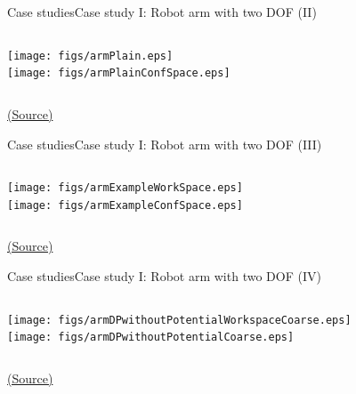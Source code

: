 \documentclass[10pt,compress]{beamer} %
\begin{document}
\begin{frame}{Case studies}{Case study I: Robot arm with two DOF (II)}
       \begin{columns}
            \centering \texttt{[image: figs/armPlain.eps]}\\
            \centering \texttt{[image: figs/armPlainConfSpace.eps]}\\
     \end{columns}
  \centering \tiny{\href{http://aima.cs.berkeley.edu/index.html}{(Source)}}
\end{frame}

\begin{frame}{Case studies}{Case study I: Robot arm with two DOF (III)}
       \begin{columns}
	            \centering \texttt{[image: figs/armExampleWorkSpace.eps]}\\
	            \centering \texttt{[image: figs/armExampleConfSpace.eps]}\\
      \end{columns}
	  \centering \tiny{\href{http://aima.cs.berkeley.edu/index.html}{(Source)}}
\end{frame}

\begin{frame}{Case studies}{Case study I: Robot arm with two DOF (IV)}
       \begin{columns}
	            \centering \texttt{[image: figs/armDPwithoutPotentialWorkspaceCoarse.eps]}\\
	            \centering \texttt{[image: figs/armDPwithoutPotentialCoarse.eps]}\\
      \end{columns}
	  \centering \tiny{\href{http://aima.cs.berkeley.edu/index.html}{(Source)}}
\end{frame}
\end{document}
